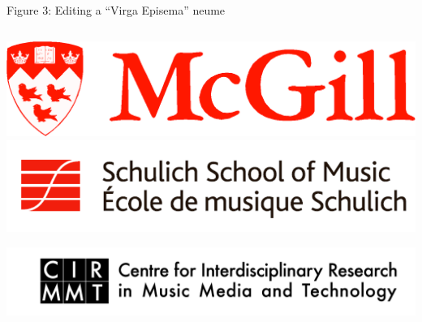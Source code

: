 \documentclass[final]{beamer}
\newlength{\onecolwid}
\newcommand{\blockSpace}{\vskip 0.75ex}
\begin{document}
\begin{frame}[fragile,t]
\begin{columns}
\begin{column}{\onecolwid}
\begin{block}{}
Figure 3: Editing a ``Virga Episema'' neume
\end{block}

\end{column}
\end{columns}


\begin{columns}
\begin{column}{\onecolwid}
\begin{block}{}
\vspace{-2cm}
\centering
\includegraphics[scale=0.2625]{images/McGill_logo}
\hspace{1.2cm} 
\includegraphics[scale=0.75]{images/Schulich_logo}

\vspace{0.75cm}

\includegraphics[scale=0.2625]{images/CIRMMT_logo}


\end{block}
\end{column}
\end{columns}
\end{frame}
\end{document}
